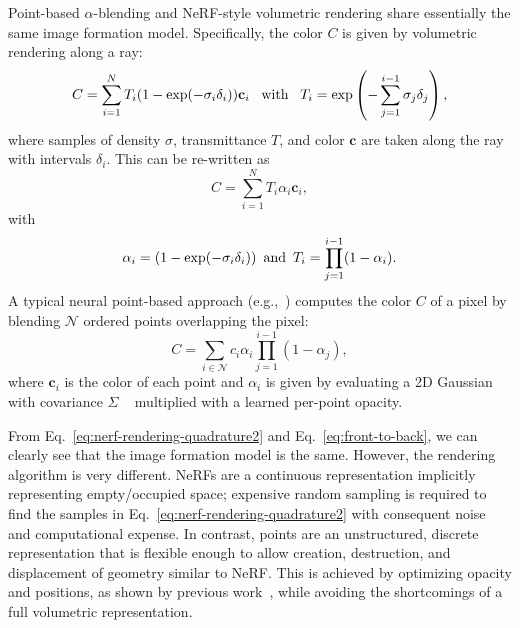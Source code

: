 Point-based $\alpha$-blending and NeRF-style volumetric rendering share essentially the same image formation model.
Specifically, the color $C$ is given by volumetric rendering along a ray:
\begin{equation}
	\label{eq:nerf-rendering-quadrature}
	C = \sum_{i=1}^N T_i(1-\exp(-\sigma_i\delta_i))\mathbf{c}_i \hspace{0.5em} \text{ with } \hspace{0.5em} T_i = \exp\left(-\sum_{j=1}^{i-1}\sigma_j\delta_j\right),
\end{equation}
where samples of density $\sigma$, transmittance $T$, and color $\mathbf{c}$ are taken along the ray with intervals $\delta_i$.
This can be re-written as
\begin{equation}
	\label{eq:nerf-rendering-quadrature2}
	C = \sum_{i=1}^N T_i\alpha_i\mathbf{c}_i,
\end{equation}
with
\begin{equation*}
	\alpha_i = (1-\exp(-\sigma_i\delta_i))
	\hspace{0.5em} \text{and} \hspace{0.5em}
	T_i = \prod_{j=1}^{i-1}(1-\alpha_i).
\end{equation*}
A typical neural point-based approach (e.g.,~\cite{kopanas21,kopanas22}) computes the color $C$ of a pixel by blending $\mathcal{N}$ ordered points overlapping the pixel:
\begin{equation}
	\label{eq:front-to-back}
	C = \sum_{i \in \mathcal{N}}
	c_{i}\alpha_{i}
	\prod_{j=1}^{i-1}(1-\alpha_{j}),
\end{equation}
where $\mathbf{c}_i$ is the color of each point and $\alpha_i$ is given by evaluating a 2D Gaussian with covariance $\Sigma$ ~\cite{yifan19} multiplied with a learned per-point opacity.

From Eq.~\ref{eq:nerf-rendering-quadrature2} and Eq.~\ref{eq:front-to-back}, we can clearly see that the image formation model is the same. However, the rendering algorithm is very different. NeRFs are a continuous representation implicitly representing empty/occupied space; expensive random sampling is required to find the samples in Eq.~\ref{eq:nerf-rendering-quadrature2} with consequent noise and computational expense. In contrast, points are an unstructured, discrete representation that is flexible enough to allow creation, destruction, and displacement of geometry similar to NeRF. This is achieved by optimizing opacity and positions, as shown by previous work~\cite{kopanas21}, while avoiding the shortcomings of a full volumetric representation.

